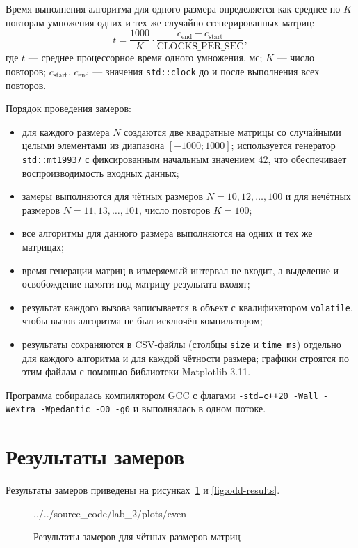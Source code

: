 \documentclass{bmstu}
\begin{document}
Время выполнения алгоритма для одного размера определяется как среднее по
$K$ повторам умножения одних и тех же случайно сгенерированных матриц:
\begin{equation}
	t=\frac{1000}{K}\cdot
	\frac{c_{\mathrm{end}}-c_{\mathrm{start}}}{\mathrm{CLOCKS\_PER\_SEC}},
\end{equation}
где $t$ --- среднее процессорное время одного умножения, мс; $K$ --- число
повторов; $c_{\mathrm{start}}$, $c_{\mathrm{end}}$ --- значения
\texttt{std::clock} до и после выполнения всех повторов.

Порядок проведения замеров:
\begin{itemize}
	\item для каждого размера $N$ создаются две квадратные матрицы со
	      случайными целыми элементами из диапазона $[-1000;1000]$;
	      используется генератор \texttt{std::mt19937} с фиксированным
	      начальным значением $42$, что обеспечивает воспроизводимость
	      входных данных;
	\item замеры выполняются для чётных размеров $N=10,12,\ldots,100$ и
	      для нечётных размеров $N=11,13,\ldots,101$, число повторов
	      $K=100$;
	\item все алгоритмы для данного размера выполняются на одних и тех же
	      матрицах;
	\item время генерации матриц в измеряемый интервал не входит, а
	      выделение и освобождение памяти под матрицу результата входят;
	\item результат каждого вызова записывается в объект с квалификатором
	      \texttt{volatile}, чтобы вызов алгоритма не был исключён
	      компилятором;
	\item результаты сохраняются в CSV-файлы (столбцы \texttt{size} и
	      \texttt{time\_ms}) отдельно для каждого алгоритма и для каждой
	      чётности размера; графики строятся по этим файлам с помощью
	      библиотеки Matplotlib 3.11.
\end{itemize}

Программа собиралась компилятором GCC с флагами
\texttt{-std=c++20 -Wall -Wextra -Wpedantic -O0 -g0} и выполнялась в одном
потоке.

\section{Результаты замеров}
Результаты замеров приведены на рисунках~\ref{fig:even-results} и \ref{fig:odd-results}.

\begin{figure}[H]
	\centering
	
	{../../source_code/lab_2/plots/even}
	\caption{Результаты замеров для чётных размеров матриц}
	\label{fig:even-results}
\end{figure}
\end{document}
